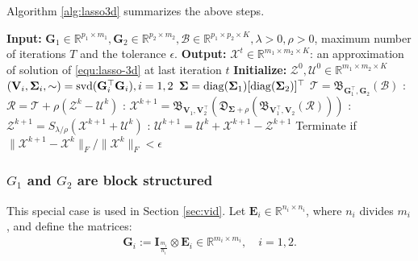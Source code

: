 \documentclass[10pt]{article}  	%
\theoremstyle{definition}
\theoremstyle{definition}
\newcommand{\R}{{\mathbb{R}}}
\newcommand{\Bc}{\boldsymbol{{\mathcal{B}}}}
\newcommand{\Xc}{ \boldsymbol{{\mathcal{X}}}}
\newcommand{\Tc}{\boldsymbol{{\mathcal{T}}}}
\newcommand{\Uc}{\boldsymbol{{\mathcal{U}}}}
\newcommand{\Rc}{\boldsymbol{{\mathcal{R}}}}
\newcommand{\Zc}{\boldsymbol{{\mathcal{Z}}}}
\newcommand{\diag}{{\rm{diag}}}
\newcommand{\svd}{{\rm{svd}}}
\newcommand{\mE}{\mathbf{E}}
\newcommand{\mG}{\mathbf{G}}
\newcommand{\mI}{\mathbf{I}}
\newcommand{\mV}{\mathbf{V}}
\theoremstyle{remark}
\begin{document}
Algorithm \ref{alg:lasso3d} summarizes the above steps.



\begin{algorithm}[htb]
\caption{LASSO($\mG_1, \mG_2, \Bc, \lambda; \rho, T, \epsilon$): ADMM}\label{alg:lasso3d}
\begin{algorithmic}
\State\textbf{Input:} $\mG_1 \in \R^{p_1 \times m_1}, \mG_2 \in \R^{p_2 \times m_2}, \Bc\in\R^{p_1 \times p_2\times K}, \lambda >0, \rho>0$, maximum number of iterations $T$ and the tolerance $\epsilon$.
\State\textbf{Output:} $\Xc^{t}\in\R^{m_1 \times m_2\times K}$: an approximation of solution of \eqref{equ:lasso-3d} at last iteration $t$
\State\textbf{Initialize:} $\Zc^0, \Uc^0 \in \R^{m_1\times m_2 \times K}$ 
\State $(\mV_i, \mathbf{\Sigma}_i, \sim) = \svd(\mG_i^\top \mG_i), i = 1, 2$
\State $\mathbf{\Sigma} = \diag(\mathbf{\Sigma}_1)[\diag(\mathbf{\Sigma}_2)]^\top$
\State $\Tc = \mathfrak{B}_{\mG_1^\top, \mG_2}(\Bc)$
: $\Rc = \Tc + \rho (\Zc^{k} -\Uc^k)$ 
: $\Xc^{k+1} = \mathfrak{B}_{\mV_1, \mV_2^\top} \left( \mathfrak{D}_{\mathbf{\Sigma} + \rho}(\mathfrak{B}_{\mV_1^\top, \mV_2} ( \Rc )) \right )$ 
: $\Zc^{k+1} = S_{\lambda/\rho}(\Xc^{k+1} + \Uc^k)$
: $\Uc^{k+1} =\Uc^k + \Xc^{k+1} - \Zc^{k+1}$
\State Terminate if $\|\Xc^{k+1}-\Xc^k\|_F/\|\Xc^k\|_F <\epsilon$ 
\EndFor
\end{algorithmic}
\end{algorithm}


\subsubsection*{$G_1$ and $G_2$ are block structured}  
This special case is used in Section \ref{sec:vid}. Let $\mE_i \in \mathbb{R}^{n_i \times n_i}$, where $n_i$ divides $m_i$, and define the matrices:
\begin{align}\label{equ:Gi}
\mG_i := \mI_{\frac{m_i}{n_i}}\otimes \mE_i\in\R^{m_i\times m_i},\quad i = 1, 2.
\end{align}
\end{document}
